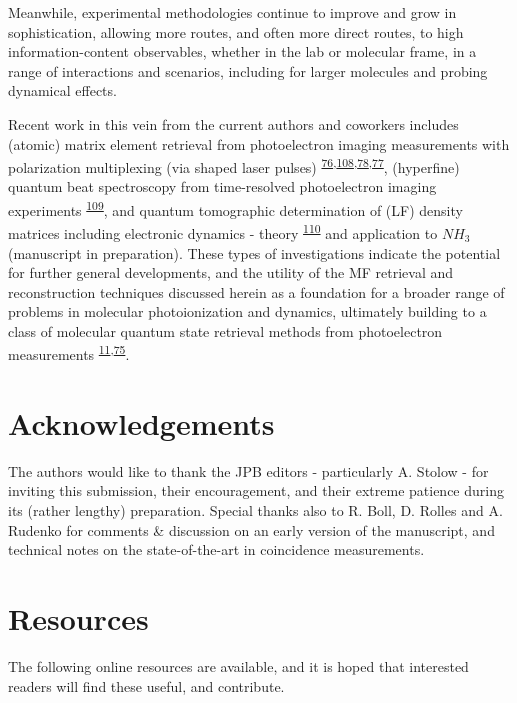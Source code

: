 \documentclass[10pt]{article}
\begin{document}
Meanwhile, experimental methodologies continue to improve and grow in sophistication, allowing more routes, and often more direct routes, to high information-content observables, whether in the lab or molecular frame, in a range of interactions and scenarios, including for larger molecules and probing dynamical effects. 


Recent work in this vein from the current authors and coworkers includes (atomic) matrix element retrieval from photoelectron imaging measurements with polarization multiplexing (via shaped laser pulses) \textsuperscript{\hyperref[csl:76]{76},\hyperref[csl:108]{108},\hyperref[csl:78]{78},\hyperref[csl:77]{77}}, (hyperfine) quantum beat spectroscopy from time-resolved photoelectron imaging experiments \textsuperscript{\hyperref[csl:109]{109}}, and quantum tomographic determination of (LF) density matrices including electronic dynamics - theory \textsuperscript{\hyperref[csl:110]{110}} and application to $NH_3$ (manuscript in preparation). These types of investigations indicate the potential for further general developments, and the utility of the MF retrieval and reconstruction techniques discussed herein as a foundation for a broader range of problems in molecular photoionization and dynamics, ultimately building to a class of molecular quantum state retrieval methods from photoelectron measurements \textsuperscript{\hyperref[csl:11]{11},\hyperref[csl:75]{75}}. 






\section{Acknowledgements}

The authors would like to thank the JPB editors - particularly A. Stolow - for inviting this submission, their encouragement, and their extreme patience during its (rather lengthy) preparation. Special thanks also to R. Boll, D. Rolles and A. Rudenko for comments \& discussion on an early version of the manuscript, and technical notes on the state-of-the-art in coincidence measurements.

\section{Resources\label{sec:resources}}

The following online resources are available, and it is hoped that interested readers will find these useful, and contribute.
\end{document}

